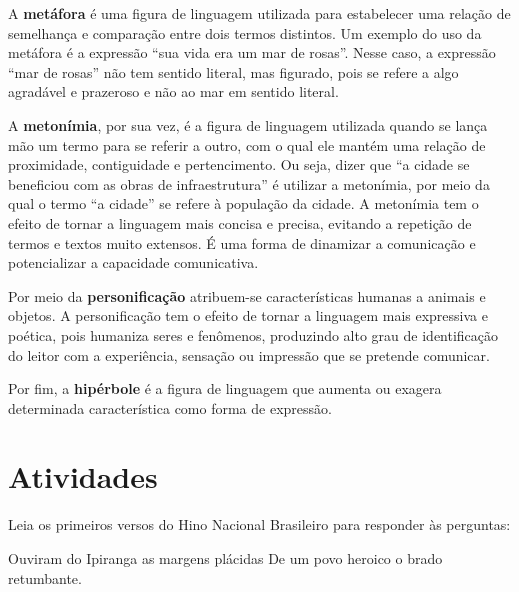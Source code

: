 {{A \textbf{metáfora} é uma figura de linguagem utilizada para
estabelecer uma relação de semelhança e comparação entre dois termos
distintos. Um exemplo do uso da metáfora é a expressão ``sua vida era um
mar de rosas''. Nesse caso, a expressão ``mar de rosas'' não tem sentido
literal, mas figurado, pois se refere a algo agradável e
prazeroso e não ao mar em sentido literal.

A \textbf{metonímia}, por sua vez, é a figura de linguagem utilizada quando se
lança mão um termo para se referir a outro, com o qual ele mantém uma
relação de proximidade, contiguidade e pertencimento. Ou seja, dizer que
``a cidade se beneficiou com as obras de infraestrutura'' é utilizar a metonímia,
por meio da qual o termo ``a cidade'' se refere à população da cidade. A metonímia
tem o efeito de tornar a linguagem mais concisa e precisa, evitando a repetição de
termos e textos muito extensos. É uma forma de dinamizar a comunicação e
potencializar a capacidade comunicativa.

Por meio da \textbf{personificação} atribuem-se características humanas a animais
e objetos. A personificação tem o efeito de tornar a linguagem mais expressiva e 
poética, pois humaniza seres e fenômenos, produzindo alto grau de identificação do
leitor com a experiência, sensação ou impressão que se pretende comunicar.

Por fim, a \textbf{hipérbole} é a figura de linguagem que aumenta ou exagera
determinada característica como forma de expressão.}


\section{Atividades}

Leia os primeiros versos do Hino Nacional Brasileiro para responder às perguntas:

\begin{myquote} 

Ouviram do Ipiranga as margens plácidas
De um povo heroico o brado retumbante.

\end{myquote}

}
